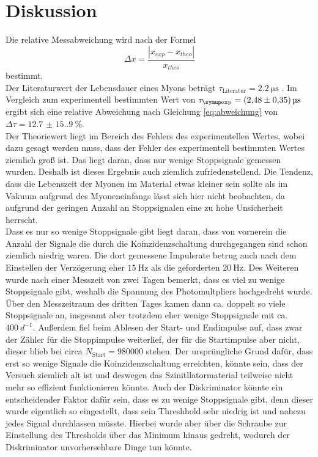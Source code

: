 \section{Diskussion}
\label{sec:Diskussion}

Die relative Messabweichung wird nach der Formel 
\begin{equation}
    \Delta x =   \frac{ \left| x_{exp} - x_{theo} \right|   }{x_{theo}}  
    \label{eq:abweichung}
\end{equation}
bestimmt. \\

Der Literaturwert der Lebensdauer eines Myons beträgt $\tau_{\text{Literatur}} = \qty{2.2}{\micro\second}$ \cite{Myon}.
Im Vergleich zum experimentell bestimmten Wert von $\tau_\T{exp} = \qty{2.48(0.35)}{\micro\second}$ ergibt sich eine relative Abweichung nach Gleichung \eqref{eq:abweichung} von $\Delta \tau = \qty{12.7(15.9)}{\%}$. \\
Der Theoriewert liegt im Bereich des Fehlers des experimentellen Wertes, wobei dazu gesagt werden muss, dass der Fehler des experimentell bestimmten Wertes ziemlich groß ist. Das liegt daran, dass nur wenige Stoppsignale gemessen wurden. Deshalb ist dieses Ergebnis auch ziemlich zufriedenstellend. Die Tendenz, dass die Lebenszeit der Myonen im Material etwas kleiner sein sollte als im Vakuum aufgrund des Myoneneinfangs lässt sich hier nicht beobachten, da aufgrund der geringen Anzahl an Stoppsignalen eine zu hohe Unsicherheit herrscht. \\
Dass es nur so wenige Stoppsignale gibt liegt daran, dass von vornerein die Anzahl der Signale die durch die Koinzidenzschaltung durchgegangen sind schon ziemlich niedrig waren. Die dort gemessene Impulsrate betrug auch nach dem Einstellen der Verzögerung eher $\qty{15}{\hertz}$ als die geforderten $\qty{20}{\hertz}$. Des Weiteren wurde nach einer Messzeit von zwei Tagen bemerkt, dass es viel zu wenige Stoppsignale gibt, weshalb die Spannung des Photomultpliers hochgedreht wurde. Über den Messzeitraum des dritten Tages kamen dann ca. doppelt so viele Stoppsignale an, insgesamt aber trotzdem eher wenige Stoppsignale mit ca. $\qty{400}{d^{-1}}$.
Außerdem fiel beim Ablesen der Start- und Endimpulse auf, dass zwar der Zähler für die Stoppimpulse weiterlief, der für die Startimpulse aber nicht, dieser blieb bei circa $N_{\text{Start}}=980000$ stehen. 
Der ursprüngliche Grund dafür, dass erst so wenige Signale die Koinzidenzschaltung erreichten, könnte sein, dass der Versuch ziemlich alt ist und deswegen das Szinitllatormaterial teilweise nicht mehr so effizient funktionieren könnte.
Auch der Diskriminator könnte ein entscheidender Faktor dafür sein, dass es zu wenige Stoppsignale gibt, denn dieser wurde eigentlich so eingestellt, dass sein Threshhold sehr niedrig ist und nahezu jedes Signal durchlassen müsste. Hierbei wurde aber über die Schraube zur Einstellung des Thresholds über das Minimum hinaus gedreht, wodurch der Diskriminator unvorhersehbare Dinge tun könnte.

\clearpage